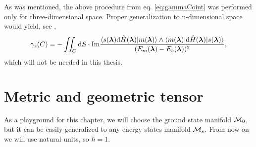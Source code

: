 As was mentioned, the above procedure from eq. \ref{eq:gammaCoint} was performed only for three-dimensional space. Proper generalization to n-dimensional space would yield, see \citep{berry1984},
\begin{equation}
    \gamma_s(C) = -\iint_C \mathrm{d} S \cdot\textrm{Im} \frac{
            \braket{s({\bm\lambda})\mathrm{d} \hat{H}({\bm\lambda}) |m({\bm\lambda})}\wedge \braket{m({\bm\lambda})|\mathrm{d}\hat{H}({\bm\lambda})|s({\bm\lambda})}    
             }{
(E_m({\bm\lambda})-E_s({\bm\lambda}))^2
             },
\end{equation}
which will not be needed in this thesis.




\section{Metric and geometric tensor}
As a playground for this chapter, we will choose the ground state manifold $\mathcal{M}_0$, but it can be easily generalized to any energy states manifold $\mathcal{M}_s$. From now on we will use natural units, so $\hbar=1$.

